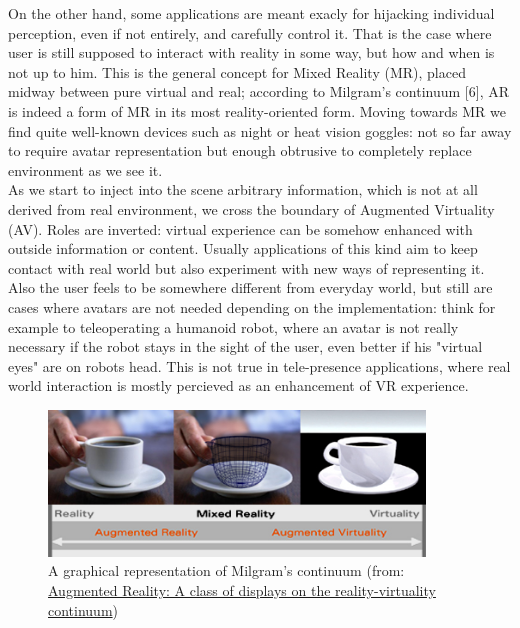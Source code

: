 On the other hand, some applications are meant exacly for hijacking individual perception, even if not entirely, and carefully control it. That is the case where user is still supposed to interact with reality in some way, but how and when is not up to him. This is the general concept for Mixed Reality (MR), placed midway between pure virtual and real; according to Milgram’s continuum [6], AR is indeed a form of MR in its most reality-oriented form. Moving towards MR we find quite well-known devices such as night or heat vision goggles: not so far away to require avatar representation but enough obtrusive to completely replace environment as we see it.\\
As we start to inject into the scene arbitrary information, which is not at all derived from real environment, we cross the boundary of Augmented Virtuality (AV). Roles are inverted: virtual experience can be somehow enhanced with outside information or content. Usually applications of this kind aim to keep contact with real world but also experiment with new ways of representing it. Also the user feels to be somewhere different from everyday world, but still are cases where avatars are not needed depending on the implementation: think for example to teleoperating a humanoid robot, where an avatar is not really necessary if the robot stays in the sight of the user, even better if his "virtual eyes" are on robots head. This is not true in tele-presence applications, where real world interaction is mostly percieved as an enhancement of VR experience.

\begin{figure}
\centering
\includegraphics[width=10cm]{schemas/milgram_continuum_enhanced}
\caption{A graphical representation of Milgram's continuum (from: \href{http://proceedings.spiedigitallibrary.org/proceeding.aspx?articleid=981543}{Augmented Reality: A class of displays on the reality-virtuality continuum})}
\label{fig:milgram_continuum}
\end{figure}


